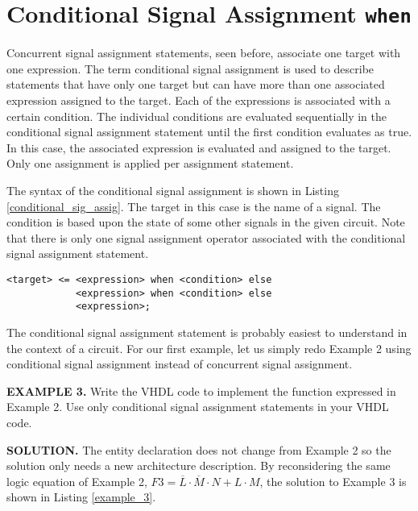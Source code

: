 \section{Conditional Signal Assignment \texttt{when}}
Concurrent signal assignment statements, seen before, associate one target with one expression. The term conditional signal assignment is used to describe statements that have only one target but can have more than one associated expression assigned to the target. Each of the expressions is associated with a certain condition. The individual conditions are evaluated sequentially in the conditional signal assignment statement until the first condition evaluates as true. In this case, the associated expression is evaluated and assigned to the target. Only one assignment is applied per assignment statement.

The syntax of the conditional signal assignment is shown in Listing \ref{conditional_sig_assig}. The target in this case is the name of a signal. The condition is based upon the state of some other signals in the given circuit. Note that there is only one signal assignment operator associated with the conditional signal assignment statement.

\noindent
\begin{minipage}{0.99\linewidth}
\begin{lstlisting}[label=conditional_sig_assig, caption=The syntax for the conditional signal assignment statement.]
<target> <=	<expression> when <condition> else
			<expression> when <condition> else
			<expression>;
\end{lstlisting}
\end{minipage}

The conditional signal assignment statement is probably easiest to understand in the context of a circuit. For our first example, let us simply redo Example 2 using conditional signal assignment instead of concurrent signal assignment.

\begin{leftbar}
\noindent
\textbf{EXAMPLE 3.}
Write the VHDL code to implement the function expressed in Example 2. Use only conditional signal assignment statements in your VHDL code. 
\end{leftbar}
\noindent
\textbf{SOLUTION.} The entity declaration does not change from Example 2 so the solution only needs a new architecture description. By reconsidering the same logic equation of Example 2, $F3=\overline{L} \cdot \overline{M} \cdot N+L \cdot M$, the solution to Example 3 is shown in Listing \ref{example_3}.

